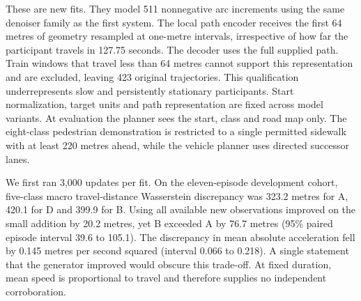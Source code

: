 These are new fits. They model 511 nonnegative arc increments using the same denoiser family as the first system. The local path encoder receives the first 64 metres of geometry resampled at one-metre intervals, irrespective of how far the participant travels in 127.75 seconds. The decoder uses the full supplied path. Train windows that travel less than 64 metres cannot support this representation and are excluded, leaving 423 original trajectories. This qualification underrepresents slow and persistently stationary participants. Start normalization, target units and path representation are fixed across model variants. At evaluation the planner sees the start, class and road map only. The eight-class pedestrian demonstration is restricted to a single permitted sidewalk with at least 220 metres ahead, while the vehicle planner uses directed successor lanes.

We first ran 3,000 updates per fit. On the eleven-episode development cohort, five-class macro travel-distance Wasserstein discrepancy was 323.2 metres for A, 420.1 for D and 399.9 for B. Using all available new observations improved on the small addition by 20.2 metres, yet B exceeded A by 76.7 metres (95\% paired episode interval 39.6 to 105.1). The discrepancy in mean absolute acceleration fell by 0.145 metres per second squared (interval 0.066 to 0.218). A single statement that the generator improved would obscure this trade-off. At fixed duration, mean speed is proportional to travel and therefore supplies no independent corroboration.




